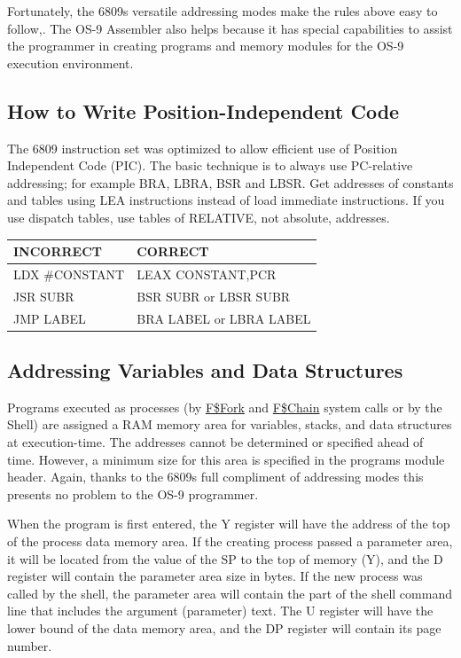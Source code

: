 \documentclass[
]{article}
\newcounter{none} %
\begin{document}
Fortunately, the 6809\textquotesingle s versatile addressing modes make
the rules above easy to follow,. The OS-9 Assembler also helps because
it has special capabilities to assist the programmer in creating
programs and memory modules for the OS-9 execution environment.

\subsection{How to Write Position-Independent Code}

The 6809 instruction set was optimized to allow efficient use of
Position Independent Code (PIC). The basic technique is to always use
PC-relative addressing; for example BRA, LBRA, BSR and LBSR. Get
addresses of constants and tables using LEA instructions instead of load
immediate instructions. If you use dispatch tables, use tables of
RELATIVE, not absolute, addresses.

{\def\LTcaptype{none} %
\begin{longtable}[]{@{}ll@{}}
\toprule\noalign{}
INCORRECT & CORRECT \\
\midrule\noalign{}
\endhead
\bottomrule\noalign{}
\endlastfoot
LDX \#CONSTANT & LEAX CONSTANT,PCR \\
JSR SUBR & BSR SUBR or LBSR SUBR \\
JMP LABEL & BRA LABEL or LBRA LABEL \\
\end{longtable}
}

\subsection{Addressing Variables and Data Structures}

Programs executed as processes (by \hyperref[f.fork]{F\$Fork} and
\hyperref[f.chain]{F\$Chain} system calls or by the Shell) are assigned
a RAM memory area for variables, stacks, and data structures at
execution-time. The addresses cannot be determined or specified ahead of
time. However, a minimum size for this area is specified in the
program\textquotesingle s module header. Again, thanks to the
6809\textquotesingle s full compliment of addressing modes this presents
no problem to the OS-9 programmer.

When the program is first entered, the Y register will have the address
of the top of the process\textquotesingle{} data memory area. If the
creating process passed a parameter area, it will be located from the
value of the SP to the top of memory (Y), and the D register will
contain the parameter area size in bytes. If the new process was called
by the shell, the parameter area will contain the part of the shell
command line that includes the argument (parameter) text. The U register
will have the lower bound of the data memory area, and the DP register
will contain its page number.
\end{document}
